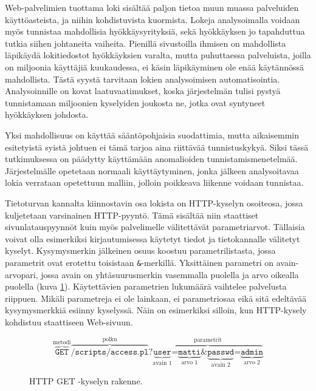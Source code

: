 Web-palvelimien tuottama loki sisältää paljon tietoa muun muassa
palveluiden käyttöasteista, ja niihin kohdistuvista kuormista. Lokeja
analysoimalla voidaan myös tunnistaa mahdollisia hyökkäysyrityksiä,
sekä hyökkäyksen jo tapahduttua tutkia siihen johtaneita
vaiheita. Pienillä sivustoilla ihmisen on mahdollista läpikäydä
lokitiedostot hyökkäyksien varalta, mutta puhuttaessa palveluista,
joilla on miljoonia käyttäjiä kuukaudessa, ei käsin läpikäyminen ole
enää käytännössä mahdollista. Tästä syystä tarvitaan lokien
analysoimisen automatisointia. Analysoinnille on kovat
laatuvaatimukset, koska järjestelmän tulisi pystyä tunnistamaan
miljoonien kyselyiden joukosta ne, jotka ovat syntyneet hyökkäyksen
johdosta.

Yksi mahdollisuus on käyttää sääntöpohjaisia suodattimia, mutta
aikaisemmin esitetyistä syistä johtuen ei tämä tarjoa aina riittävää
tunnistuskykyä. Siksi tässä tutkimuksessa on päädytty käyttämään
anomalioiden tunnistamismenetelmää. Järjestelmälle opetetaan
normaali käyttäytyminen, jonka jälkeen analysoitavaa lokia verrataan
opetettuun malliin, jolloin poikkeava liikenne voidaan tunnistaa.

Tietoturvan kannalta kiinnostavin osa lokista on HTTP-kyselyn
osoiteosa, jossa kuljetetaan varsinainen HTTP-pyyntö. Tämä sisältää
niin staattiset sivunlatauspyynnöt kuin myös palvelimelle
välitettävät parametriarvot. Tällaisia voivat olla esimerkiksi
kirjautumisessa käytetyt tiedot ja tietokannalle välitetyt
kyselyt. Kysymysmerkin jälkeinen osuus koostuu
parametrilistasta, jossa parametrit ovat erotettu toisistaan
\texttt{\&}-merkillä. Yksittäinen parametri on avain-arvopari, jossa
avain on yhtäsuurusmerkin
vasemmalla puolella ja arvo oikealla puolella (kuva
\ref{CLF2}). Käytettävien parametrien lukumäärä vaihtelee palvelusta
riippuen. Mikäli parametreja ei ole lainkaan, ei parametriosaa eikä
sitä edeltävää kysymysmerkkiä esiinny kyselyssä. Näin on esimerkiksi
silloin, kun HTTP-kysely kohdistuu staattiseen Web-sivuun.

\vskip 0.5cm
\begin{figure}[ht]
\[
\overbrace{\texttt{GET}}^\text{metodi}
\overbrace{\texttt{/scripts/access.pl}}^\text{polku}
\texttt{?}
\overbrace{\underbrace{\texttt{user}}_\text{avain 1}
\texttt{=}
\underbrace{\texttt{matti}}_\text{arvo 1}
\texttt{\&}
\underbrace{\texttt{passwd}}_\text{avain 2}
\texttt{=}
\underbrace{\texttt{admin}}_\text{arvo 2}}
^{\text{parametrit}}
\]
\caption{HTTP GET -kyselyn rakenne.}
\label{CLF2}
\end{figure}


